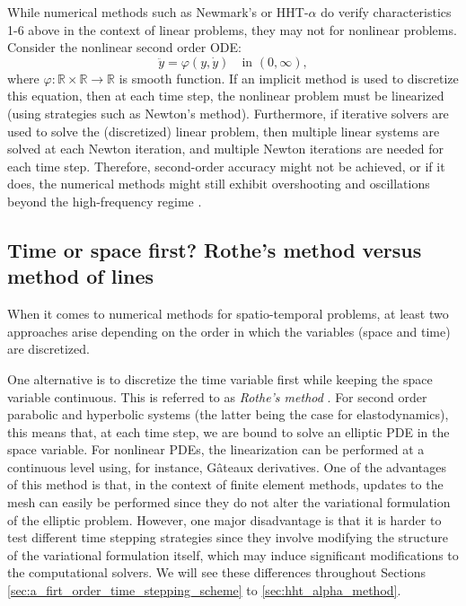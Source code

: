 \documentclass{sfuthesis}
\numberwithin{equation}{section}
\numberwithin{figure}{chapter}
\numberwithin{table}{chapter}
\theoremstyle{definition}
\newcommand{\R}{\mathbb{R}}
\begin{document}
While numerical methods such as Newmark's or HHT-$\alpha$ do verify characteristics 1-6 above in the context of linear problems, they may not for nonlinear problems. Consider the nonlinear second order ODE:
\[
    \ddot{y} = \varphi(y,\dot{y}) \quad \text{in } (0,\infty),
\]
where $\varphi:\R \times \R \to \R$ is smooth function. If an implicit method is used to discretize this equation, then at each time step, the nonlinear problem must be linearized (using strategies such as Newton's method). Furthermore, if iterative solvers are used to solve the (discretized) linear problem, then multiple linear systems are solved at each Newton iteration, and multiple Newton iterations are needed for each time step. Therefore, second-order accuracy might not be achieved, or if it does, the numerical methods might still exhibit overshooting and oscillations beyond the high-frequency regime \cite{ErlicherBonaventuraBursi2002}.


\subsection{Time or space first? Rothe's method versus method of lines}

When it comes to numerical methods for spatio-temporal problems, at least two approaches arise depending on the order in which the variables (space and time) are discretized.

One alternative is to discretize the time variable first while keeping the space variable continuous. This is referred to as \textit{Rothe's method} \cite{Rothe1930}. For second order parabolic and hyperbolic systems (the latter being the case for elastodynamics), this means that, at each time step, we are bound to solve an elliptic PDE in the space variable. For nonlinear PDEs, the linearization can be performed at a continuous level using, for instance, G\^{a}teaux derivatives. One of the advantages of this method is that, in the context of finite element methods, updates to the mesh can easily be performed since they do not alter the variational formulation of the elliptic problem. However, one major disadvantage is that it is harder to test different time stepping strategies since they involve modifying the structure of the variational formulation itself, which may induce significant modifications to the computational solvers. We will see these differences throughout Sections \ref{sec:a_firt_order_time_stepping_scheme} to \ref{sec:hht_alpha_method}.
\end{document}
